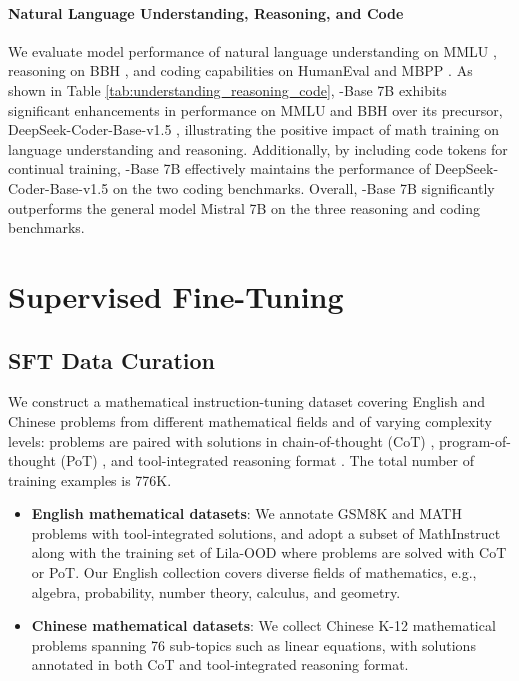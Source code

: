 \paragraph{Natural Language Understanding, Reasoning, and Code}

We evaluate model performance of natural language understanding on MMLU \citep{mmlu}, reasoning on BBH \citep{bbh}, and coding capabilities on HumanEval \citep{codex} and MBPP \citep{mbpp}. As shown in Table \ref{tab:understanding_reasoning_code}, \spmath-Base 7B exhibits significant enhancements in performance on MMLU and BBH over its precursor, DeepSeek-Coder-Base-v1.5 \citep{deepseek-coder}, illustrating the positive impact of math training on language understanding and reasoning.
Additionally, by including code tokens for continual training, \spmath-Base 7B effectively maintains the performance of DeepSeek-Coder-Base-v1.5 on the two coding benchmarks.
Overall, \spmath-Base 7B significantly outperforms the general model Mistral 7B \citep{mistral} on the three reasoning and coding benchmarks.

\section{Supervised Fine-Tuning}

\subsection{SFT Data Curation}

We construct a mathematical instruction-tuning dataset covering English and Chinese problems from different mathematical fields and of varying complexity levels:
problems are paired with solutions in chain-of-thought (CoT) \citep{cot}, program-of-thought (PoT) \citep{pot,pal}, and tool-integrated reasoning format \citep{tora}.
The total number of training examples is 776K.
\begin{itemize}[topsep=0pt]
    \item \textbf{English mathematical datasets}:
    We annotate GSM8K and MATH problems with tool-integrated solutions, and adopt a subset of MathInstruct \citep{MathInstruct} along with the training set of Lila-OOD \citep{lila} where problems are solved with CoT or PoT.
    Our English collection covers diverse fields of mathematics, e.g., algebra, probability, number theory, calculus, and geometry.
    \item \textbf{Chinese mathematical datasets}:
    We collect Chinese K-12 mathematical problems spanning 76 sub-topics such as linear equations, with solutions annotated in both CoT and tool-integrated reasoning format.
\end{itemize}

